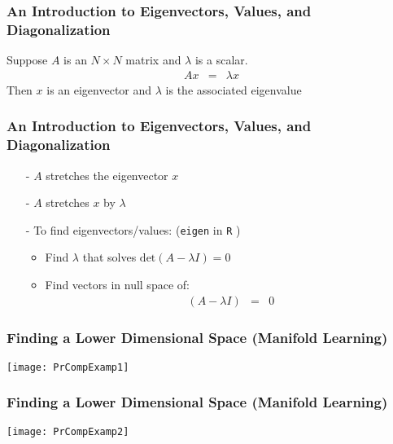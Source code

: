 \begin{frame}[fragile]
\frametitle{An Introduction to Eigenvectors, Values, and Diagonalization}
\begin{defn}
Suppose ${A}$ is an $N \times N$ matrix and $\lambda$ is a scalar. 
\begin{eqnarray}
{A}{x} &= & \lambda {x} \nonumber 
\end{eqnarray}
Then ${x}$ is an \alert{eigenvector} and $\lambda$ is the associated \alert{eigenvalue}
\end{defn}

\end{frame}

\begin{frame}[fragile]
\frametitle{An Introduction to Eigenvectors, Values, and Diagonalization}
\begin{itemize}
\item[-] ${A}$ stretches the eigenvector ${x}$ 
\item[-] ${A}$ stretches ${x}$ by $\lambda$  
\item[-] To find eigenvectors/values: ({\tt eigen} in {\tt R} )  
\begin{itemize}
\item Find $\lambda$ that solves $\text{det}({A}- \lambda {I}) = 0 $ 
\item Find vectors in \alert{null space} of:  
\begin{eqnarray}
({A} - \lambda {I} ) &= & 0 \nonumber 
\end{eqnarray}
\end{itemize}
\end{itemize}
\end{frame}



\begin{frame}[fragile]
\frametitle{Finding a Lower Dimensional Space (Manifold Learning)}
\begin{center}
\texttt{[image: PrCompExamp1]}
\end{center}

\end{frame}

\begin{frame}[fragile]
\frametitle{Finding a Lower Dimensional Space (Manifold Learning)}
\begin{center}
\texttt{[image: PrCompExamp2]}
\end{center}

\end{frame}


